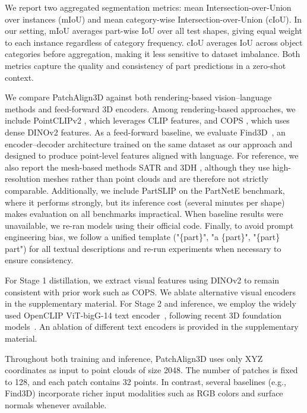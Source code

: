 We report two aggregated segmentation metrics: mean Intersection-over-Union over instances (mIoU) and mean category-wise Intersection-over-Union (cIoU). 
In our setting, mIoU averages part-wise IoU over all test shapes, giving equal weight to each instance regardless of category frequency. 
cIoU averages IoU across object categories before aggregation, making it less sensitive to dataset imbalance. 
Both metrics capture the quality and consistency of part predictions in a zero-shot context.

We compare PatchAlign3D against both rendering-based vision–language methods and feed-forward 3D encoders.
Among rendering-based approaches, we include PointCLIPv2 \cite{zhu2022pointclip}, which leverages CLIP \cite{radford2021learning} features, and COPS \cite{garosi20253d}, which uses dense DINOv2 \cite{oquab2023dinov2} features. 
As a feed-forward baseline, we evaluate Find3D~\cite{ma2025find}, an encoder–decoder architecture trained on the same dataset as our approach and designed to produce point-level features aligned with language.
For reference, we also report the mesh-based methods SATR \cite{abdelreheem2023satr} and 3DH \cite{decatur20233d}, although they use high-resolution meshes rather than point clouds and are therefore not strictly comparable. 
Additionally, we include PartSLIP \cite{liu2023partslip} on the PartNetE benchmark, where it performs strongly, but its inference cost (several minutes per shape) makes evaluation on all benchmarks impractical. 
When baseline results were unavailable, we re-ran models using their official code. 
Finally, to avoid prompt engineering bias, we follow a unified template ("\{part\}", "a \{part\}", "\{part\} part") for all textual descriptions and re-run experiments when necessary to ensure consistency.

For Stage 1 distillation, we extract visual features using DINOv2 \cite{oquab2023dinov2} to remain consistent
with prior work such as COPS. We ablate alternative visual encoders in the supplementary material. For Stage 2 and inference, we employ the widely used OpenCLIP ViT-bigG-14 text encoder~\cite{radford2021learning}, following recent 3D foundation models~\cite{liu2023openshape, zhou2023uni3d}. An ablation of different text encoders is provided in the supplementary material.

Throughout both training and inference, PatchAlign3D uses only XYZ coordinates as input to point clouds of size 2048. The number of patches is fixed to 128, and each patch contains 32 points.
In contrast, several baselines (e.g., Find3D) incorporate richer input modalities such as
RGB colors and surface normals whenever available.

